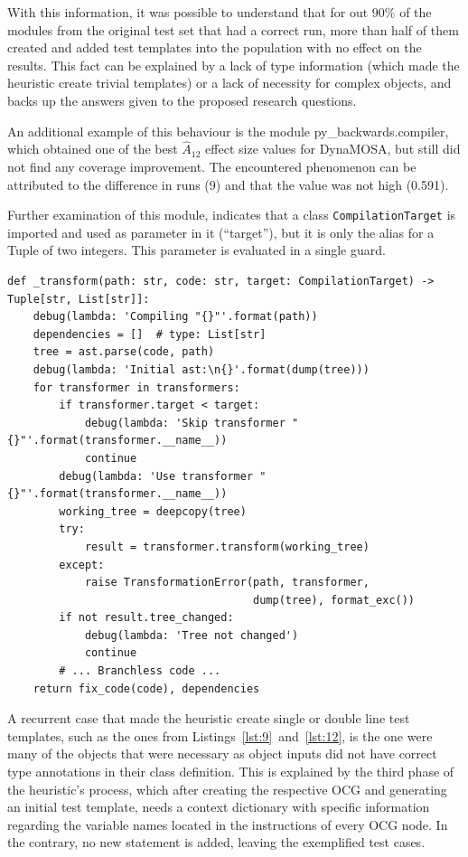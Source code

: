 \documentclass[%
  chapterprefix=false,%
  open=right,%
  twoside=true,%
  paper=a4,%
  logofile={Figures/logo.png},%
  thesistype=master,%
  UKenglish,%
]{se2thesis}
\newcommand{\classname}[1]{\texttt{#1}}
\begin{document}
With this information, it was possible to understand that for out \(90\%\) of the modules from the original test set that had a correct run, more than half of them created and added test templates into the population with no effect on the results. 
This fact can be explained by a lack of type information (which made the heuristic create trivial templates) or a lack of necessity for complex objects, and backs up the answers given to the proposed research questions.

An additional example of this behaviour is the module py\_backwards.compiler, which obtained one of the best \(\hat{A}_{12}\) effect size values for DynaMOSA, but still did not find any coverage improvement.
The encountered phenomenon can be attributed to the difference in runs (9) and that the value was not high (0.591).

Further examination of this module, indicates that a class \classname{CompilationTarget} is imported and used as parameter in it (``target''), but it is only the alias for a Tuple of two integers.
This parameter is evaluated in a single guard.

\begin{verbatim}
def _transform(path: str, code: str, target: CompilationTarget) -> Tuple[str, List[str]]:
    debug(lambda: 'Compiling "{}"'.format(path))
    dependencies = []  # type: List[str]
    tree = ast.parse(code, path)
    debug(lambda: 'Initial ast:\n{}'.format(dump(tree)))
    for transformer in transformers:
        if transformer.target < target:
            debug(lambda: 'Skip transformer "{}"'.format(transformer.__name__))
            continue
        debug(lambda: 'Use transformer "{}"'.format(transformer.__name__))
        working_tree = deepcopy(tree)
        try:
            result = transformer.transform(working_tree)
        except:
            raise TransformationError(path, transformer,
                                      dump(tree), format_exc())
        if not result.tree_changed:
            debug(lambda: 'Tree not changed')
            continue
        # ... Branchless code ...
    return fix_code(code), dependencies
\end{verbatim}

A recurrent case that made the heuristic create single or double line test templates, such as the ones from Listings~\ref{lst:9}~and~\ref{lst:12}, is the one were many of the objects that were necessary as object inputs did not have correct type annotations in their class definition.
This is explained by the third phase of the heuristic's process, which after creating the respective OCG and generating an initial test template, needs a context dictionary with specific information regarding the variable names located in the instructions of every OCG node.
In the contrary, no new statement is added, leaving the exemplified test cases.
\end{document}
